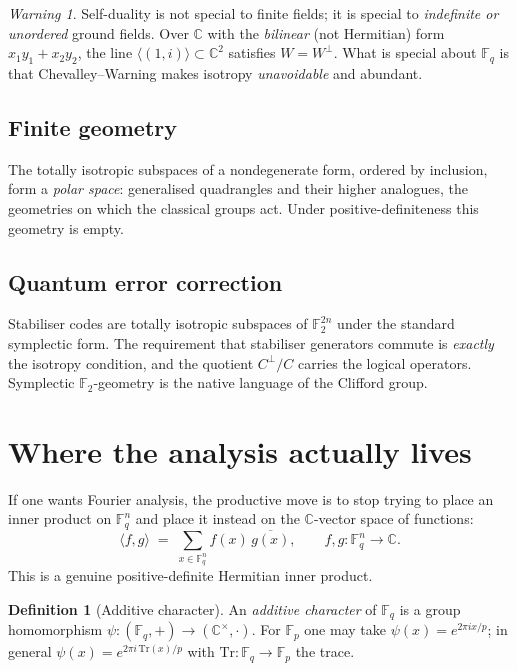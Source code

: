 \documentclass[11pt,a4paper]{article}
\theoremstyle{definition}
\newtheorem{definition}[theorem]{Definition}
\theoremstyle{remark}
\newtheorem{warning}[theorem]{Warning}
\newcommand{\FF}{\mathbb{F}}
\newcommand{\CC}{\mathbb{C}}
\newcommand{\ip}[2]{\langle #1, #2 \rangle}
\newcommand{\perpp}{^{\perp}}
\begin{document}
\begin{warning}
Self-duality is not special to finite fields; it is special to \emph{indefinite or
unordered} ground fields. Over $\CC$ with the \emph{bilinear} (not Hermitian) form
$x_1y_1 + x_2y_2$, the line $\langle (1,i)\rangle \subset \CC^{2}$ satisfies $W = W\perpp$.
What is special about $\FF_q$ is that Chevalley--Warning makes isotropy \emph{unavoidable}
and abundant.
\end{warning}

\subsection{Finite geometry}

The totally isotropic subspaces of a nondegenerate form, ordered by inclusion, form a
\emph{polar space}: generalised quadrangles and their higher analogues, the geometries on
which the classical groups act. Under positive-definiteness this geometry is empty.

\subsection{Quantum error correction}

Stabiliser codes are totally isotropic subspaces of $\FF_2^{2n}$ under the standard symplectic
form. The requirement that stabiliser generators commute is \emph{exactly} the isotropy
condition, and the quotient $C\perpp/C$ carries the logical operators. Symplectic
$\FF_2$-geometry is the native language of the Clifford group.

\section{Where the analysis actually lives}\label{sec:fourier}

If one wants Fourier analysis, the productive move is to stop trying to place an inner product
on $\FF_q^{n}$ and place it instead on the $\CC$-vector space of functions:
\[
  \ip{f}{g} \;=\; \sum_{x \in \FF_q^{n}} f(x)\,\overline{g(x)},
  \qquad f, g : \FF_q^{n} \to \CC .
\]
This is a genuine positive-definite Hermitian inner product.

\begin{definition}[Additive character]
An \emph{additive character} of $\FF_q$ is a group homomorphism $\psi : (\FF_q, +) \to
(\CC^{\times}, \cdot)$. For $\FF_p$ one may take $\psi(x) = e^{2\pi i x/p}$; in general
$\psi(x) = e^{2\pi i \,\mathrm{Tr}(x)/p}$ with $\mathrm{Tr} : \FF_q \to \FF_p$ the trace.
\end{definition}
\end{document}
